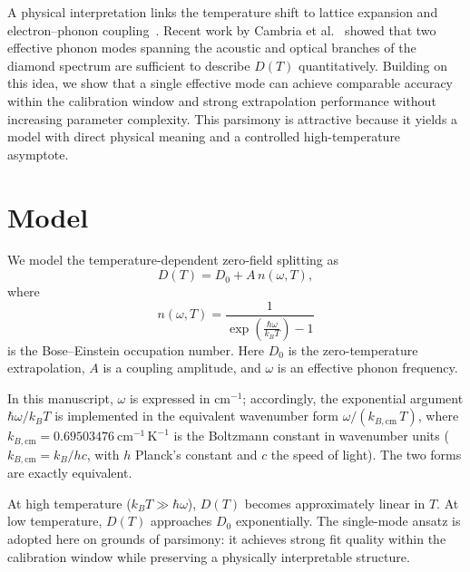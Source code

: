 \documentclass[12pt]{article}
\begin{document}
A physical interpretation links the temperature shift to lattice expansion and electron--phonon coupling~\citep{doherty2014}. Recent work by Cambria et al.~\citep{cambria2024} showed that two effective phonon modes spanning the acoustic and optical branches of the diamond spectrum are sufficient to describe $D(T)$ quantitatively. Building on this idea, we show that a single effective mode can achieve comparable accuracy within the calibration window and strong extrapolation performance without increasing parameter complexity. This parsimony is attractive because it yields a model with direct physical meaning and a controlled high-temperature asymptote.

\section{Model}
We model the temperature-dependent zero-field splitting as
\begin{equation}
D(T) = D_0 + A\,n(\omega,T),
\end{equation}
where
\begin{equation}
 n(\omega,T) = \frac{1}{\exp\!\left(\frac{\hbar\omega}{k_B T}\right)-1}
\end{equation}
is the Bose--Einstein occupation number. Here $D_0$ is the zero-temperature extrapolation, $A$ is a coupling amplitude, and $\omega$ is an effective phonon frequency.

In this manuscript, $\omega$ is expressed in cm$^{-1}$; accordingly, the exponential argument $\hbar\omega/k_BT$ is implemented in the equivalent wavenumber form $\omega/(k_{B,\text{cm}}\,T)$, where $k_{B,\text{cm}} = 0.69503476\ \text{cm}^{-1}\,\text{K}^{-1}$ is the Boltzmann constant in wavenumber units ($k_{B,\text{cm}} = k_B/hc$, with $h$ Planck's constant and $c$ the speed of light). The two forms are exactly equivalent.

At high temperature ($k_B T \gg \hbar\omega$), $D(T)$ becomes approximately linear in $T$. At low temperature, $D(T)$ approaches $D_0$ exponentially. The single-mode ansatz is adopted here on grounds of parsimony: it achieves strong fit quality within the calibration window while preserving a physically interpretable structure.

\end{document}
